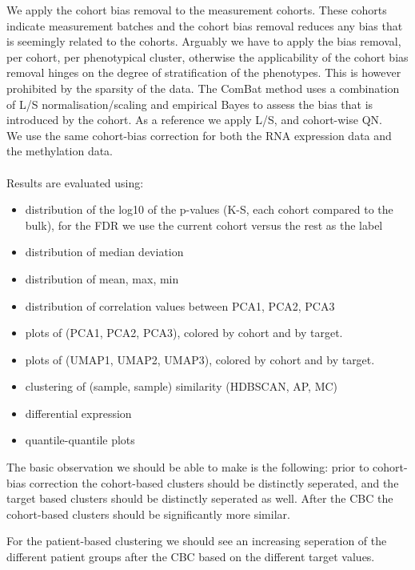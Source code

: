 \documentclass[a4paper,10pt]{article}
\begin{document}
We apply the cohort bias removal to the measurement cohorts. These cohorts indicate measurement batches and the cohort bias removal reduces any bias that is seemingly related to the cohorts. Arguably we have to apply the bias removal, per cohort, per phenotypical cluster, otherwise the applicability of the cohort bias removal hinges on the degree of stratification of the phenotypes. This is however prohibited by the sparsity of the data.
The ComBat method uses a combination of L/S normalisation/scaling and empirical Bayes to assess the bias that is introduced by the cohort. As a reference we apply L/S, and cohort-wise QN.  \\ 
%
We use the same cohort-bias correction for both the RNA expression data and the methylation data. \\ \\
%
Results are evaluated using:
\begin{itemize}
\item distribution of the log10 of the p-values (K-S, each cohort compared to the bulk), for the FDR we use the current cohort versus the rest as the label
\item distribution of median deviation
\item distribution of mean, max, min 
\item distribution of correlation values between PCA1, PCA2, PCA3
\item plots of (PCA1, PCA2, PCA3), colored by cohort and by target.
\item plots of (UMAP1, UMAP2, UMAP3), colored by cohort and by target.
\item clustering of (sample, sample) similarity (HDBSCAN, AP, MC)
\item differential expression
\item quantile-quantile plots
\end{itemize}
%

The basic observation we should be able to make is the following:
prior to cohort-bias correction the cohort-based clusters should be distinctly seperated, 
and the target based clusters should be distinctly seperated as well. After the CBC the cohort-based clusters
should be significantly more similar. 

For the patient-based clustering we should see an increasing seperation of the different patient groups after the CBC based on the different target values.
\end{document}
